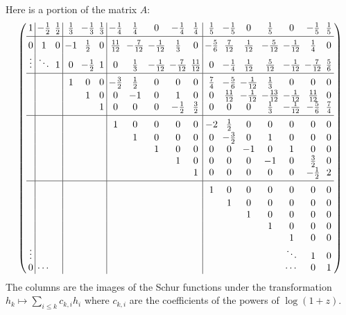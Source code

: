 \documentclass[12pt,dvips]{amsart}
\begin{document}
\bigskip
\noindent
Here is a portion of the matrix $A$:
\[
\left(
\setlength{\arraycolsep}{2pt}
\def\str{{\vrule height12pt depth5pt width0pt}}%
\begin{array}{c|cc|ccc|ccccc|ccccccc}
 1 & -\frac{1}{2} & \frac{1}{2} & \frac{1}{3} & -\frac{1}{3} & \frac{1}{3} & -\frac{1}{4} & \frac{1}{4} & 0 & -\frac{1}{4} & \frac{1}{4} &   \frac{1}{5} & -\frac{1}{5} & 0 & \frac{1}{5} & 0 & -\frac{1}{5} & \frac{1}{5} \\
[2pt]\hline\str 
 0 & 1 & 0 & -1 & \frac{1}{2} & 0 & \frac{11}{12} & -\frac{7}{12} & -\frac{1}{12} & \frac{1}{3} & 0 & -\frac{5}{6} & \frac{7}{12} &   \frac{1}{12} & -\frac{5}{12} & -\frac{1}{12} & \frac{1}{4} & 0 \\
 \vdots & \ddots & 1 & 0 & -\frac{1}{2} & 1 & 0 & \frac{1}{3} & -\frac{1}{12} & -\frac{7}{12} & \frac{11}{12} & 0 & -\frac{1}{4} & \frac{1}{12} &  \frac{5}{12} & -\frac{1}{12} & -\frac{7}{12} & \frac{5}{6} \\
[2pt]\hline\str 
   &  &   & 1 & 0 & 0 & -\frac{3}{2} & \frac{1}{2} & 0 & 0 & 0 & \frac{7}{4} & -\frac{5}{6} & -\frac{1}{12} & \frac{1}{3} & 0 & 0 & 0 \\
   &   &   &   & 1 & 0 & 0 & -1 & 0 & 1 & 0 & 0 & \frac{11}{12} & -\frac{1}{12} & -\frac{13}{12} & -\frac{1}{12} & \frac{11}{12} & 0 \\
   &   &   &   &   & 1 & 0 & 0 & 0 & -\frac{1}{2} & \frac{3}{2} & 0 & 0 & 0 & \frac{1}{3} & -\frac{1}{12} & -\frac{5}{6} & \frac{7}{4} \\
[2pt]\hline\str 
   &   &   &   &   &   & 1 & 0 & 0 & 0 & 0 & -2 & \frac{1}{2} & 0 & 0 & 0 & 0 & 0 \\
   &   &   &   &   &   &   & 1 & 0 & 0 & 0 & 0 & -\frac{3}{2} & 0 & 1 & 0 & 0 & 0 \\
   &   &   &   &   &   &   &   & 1 & 0 & 0 & 0 & 0 & -1 & 0 & 1 & 0 & 0 \\
   &   &   &   &   &   &   &   &   & 1 & 0 & 0 & 0 & 0 & -1 & 0 & \frac{3}{2} & 0 \\
   &   &   &   &   &   &   &   &   &   & 1 & 0 & 0 & 0 & 0 & 0 & -\frac{1}{2} & 2 \\
[2pt]\hline\str 
   &   &   &   &   &   &   &   &   &   &   & 1 & 0 & 0 & 0 & 0 & 0 & 0 \\
   &   &   &   &   &   &   &   &   &   &   &   & 1 & 0 & 0 & 0 & 0 & 0 \\
   &   &   &   &   &   &   &   &   &   &   &   &   & 1 & 0 & 0 & 0 & 0 \\
   &   &   &   &   &   &   &   &   &   &   &   &   &   & 1 & 0 & 0 & 0 \\
   &   &   &   &   &   &   &   &   &   &   &   &   &   &   & 1 & 0 & 0 \\
 \vdots &   &   &   &   &   &   &   &   &   &   &   &   &   &   & \ddots  & 1 & 0 \\
 0 & \cdots &   &   &   &   &   &   &   &   &   &   &   &   &   & \cdots & 0 & 1
\end{array}
\right)
\]
The columns are the images of the Schur functions under the transformation $h_k \mapsto \sum_{i \leq k} c_{k,i} h_i$ where $c_{k,i}$ are the coefficients of the powers of $\log(1+z)$.
\end{document}
